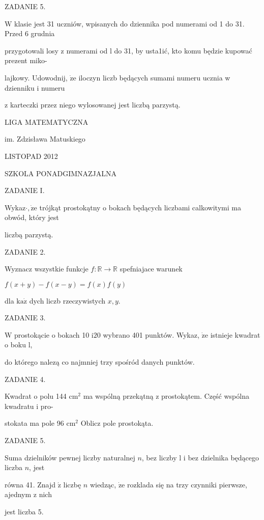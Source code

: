 \documentclass[a4paper,12pt]{article}
\begin{document}
ZADANIE 5.

$\mathrm{W}$ klasie jest 31 uczniów, wpisanych do dziennika pod numerami od 1 do 31. Przed 6 grudnia

przygotowali losy z numerami od l do 31, by usta1ić, kto komu będzie kupować prezent miko-

lajkowy. Udowodnij, $\dot{\mathrm{z}}\mathrm{e}$ iloczyn liczb będących sumami numeru ucznia w dzienniku i numeru

z karteczki przez niego wylosowanej jest liczbą parzystą.






LIGA MATEMATYCZNA

im. Zdzisława Matuskiego

LISTOPAD 2012

SZKOLA PONADGIMNAZJALNA

ZADANIE I.

Wykaz$\cdot, \dot{\mathrm{z}}\mathrm{e}$ trójkąt prostokątny o bokach będących liczbami calkowitymi ma obwód, który jest

liczbą parzystą.

ZADANIE 2.

Wyznacz wszystkie funkcje $f:\mathbb{R}\rightarrow \mathbb{R}$ spefniajace warunek

$f(x+y)-f(x-y)=f(x)f(y)$

dla $\mathrm{k}\mathrm{a}\dot{\mathrm{z}}$ dych liczb rzeczywistych $x, y.$

ZADANIE 3.

$\mathrm{W}$ prostokącie o bokach 10 $\mathrm{i}20$ wybrano 401 punktów. Wykaz, $\dot{\mathrm{z}}\mathrm{e}$ istnieje kwadrat o boku l,

do którego nalezą co najmniej trzy spośród danych punktów.

ZADANIE 4.

Kwadrat o polu 144 $\mathrm{c}\mathrm{m}^{2}$ ma wspólną przekątną z prostokątem. Część wspólna kwadratu i pro-

stokata ma pole 96 $\mathrm{c}\mathrm{m}^{2}$ Oblicz pole prostokąta.

ZADANIE 5.

Suma dzielników pewnej liczby naturalnej $n$, bez liczby l i bez dzielnika będącego liczba $n$, jest

równa 41. Znajd $\acute{\mathrm{z}}$ liczbę $n$ wiedząc, $\dot{\mathrm{z}}\mathrm{e}$ rozklada się na trzy czynniki pierwsze, ajednym z nich

jest liczba 5.
\end{document}
